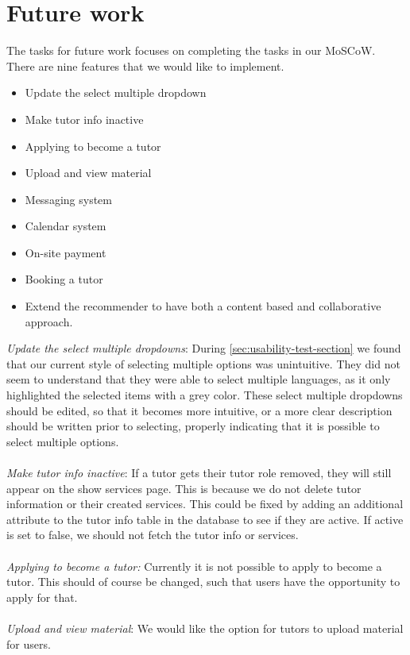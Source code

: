 \section{Future work}
The tasks for future work focuses on completing the tasks in our MoSCoW.
There are nine features that we would like to implement.

\begin{itemize}
    \item Update the select multiple dropdown
    \item Make tutor info inactive
    \item Applying to become a tutor
    \item Upload and view material
    \item Messaging system
    \item Calendar system
    \item On-site payment
    \item Booking a tutor
    \item Extend the recommender to have both a content based and collaborative approach.
\end{itemize}
\noindent
\textit{Update the select multiple dropdowns}:
During \autoref{sec:usability-test-section} we found that our current style of selecting multiple options was unintuitive. 
They did not seem to understand that they were able to select multiple languages, as it only highlighted the selected items with a grey color.
These select multiple dropdowns should be edited, so that it becomes more intuitive, or a more clear description should be written prior to selecting, properly indicating that it is possible to select multiple options.
\\\\
\textit{Make tutor info inactive}:
If a tutor gets their tutor role removed, they will still appear on the show services page. 
This is because we do not delete tutor information or their created services.
This could be fixed by adding an additional attribute to the tutor info table in the database to see if they are active.
If active is set to false, we should not fetch the tutor info or services.
\\\\
\textit{Applying to become a tutor:}
Currently it is not possible to apply to become a tutor.
This should of course be changed, such that users have the opportunity to apply for that. 
\\\\
\textit{Upload and view material}:
We would like the option for tutors to upload material for users. 
